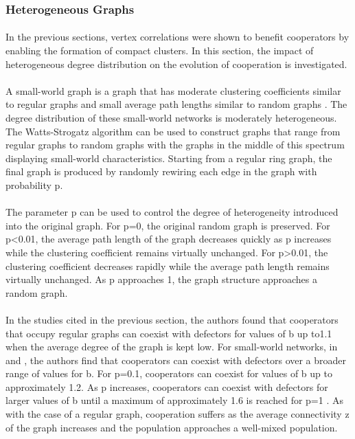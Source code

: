 \documentclass{article}
\begin{document}
    \subsubsection{Heterogeneous Graphs}
	\paragraph{}In the previous sections, vertex correlations were shown to benefit cooperators by enabling the formation of compact clusters.  In this section, the impact of heterogeneous degree distribution on the evolution of cooperation is investigated.
	\paragraph{}A small-world graph is a graph that has moderate clustering coefficients similar to regular graphs and small average path lengths similar to random graphs \cite{Watts1998}.  The degree distribution of these small-world networks is moderately heterogeneous.  The Watts-Strogatz algorithm \cite{Watts1998} can be used to construct graphs that range from regular graphs to random graphs with the graphs in the middle of this spectrum displaying small-world characteristics.  Starting from a regular ring graph, the final graph is produced by randomly rewiring each edge in the graph with probability p.
	\paragraph{}The parameter p can be used to control the degree of heterogeneity introduced into the original graph.  For p=0, the original random graph is preserved.  For p<0.01, the average path length of the graph decreases quickly as p increases while the clustering coefficient remains virtually unchanged.  For p>0.01, the clustering coefficient decreases rapidly while the average path length remains virtually unchanged.  As p approaches 1, the graph structure approaches a random graph.
	\paragraph{}In the studies cited in the previous section, the authors found that cooperators that occupy regular graphs can coexist with defectors for values of b up to1.1 when the average degree of the graph is kept low.  For small-world networks, in \cite{Pacheco2005} and \cite{Santos2006b}, the authors find that cooperators can coexist with defectors over a broader range of values for b.  For p=0.1, cooperators can coexist for values of b up to approximately 1.2.  As p increases, cooperators can coexist with defectors for larger values of b until a maximum of approximately 1.6 is reached for p=1 \cite{Santos2006b}.  As with the case of a regular graph, cooperation suffers as the average connectivity z of the graph increases and the population approaches a well-mixed population.
\end{document}

